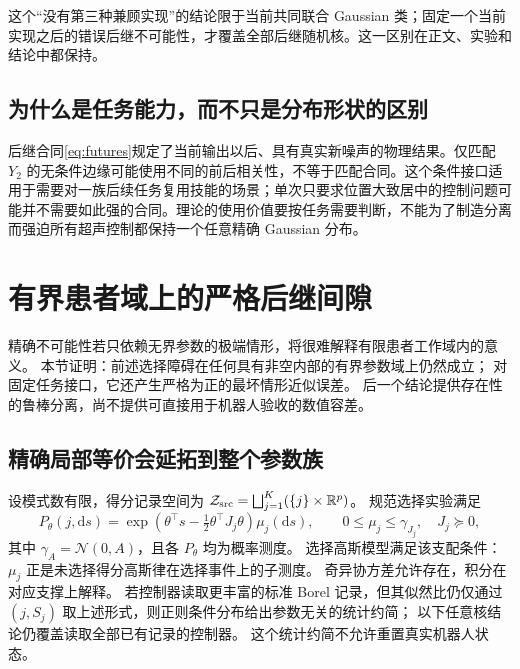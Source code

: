 \documentclass[UTF8,fontset=fandol,zihao=5,a4paper]{ctexart}
\theoremstyle{definition}
\theoremstyle{remark}\newtheorem{remark}[theorem]{说明}
\numberwithin{equation}{section}
\begin{document}
这个“没有第三种兼顾实现”的结论限于当前共同联合 Gaussian 类；固定一个当前实现之后的错误后继不可能性，才覆盖全部后继随机核。这一区别在正文、实验和结论中都保持。

\subsection{为什么是任务能力，而不只是分布形状的区别}
后继合同\eqref{eq:futures}规定了当前输出以后、具有真实新噪声的物理结果。仅匹配 $Y_2$ 的无条件边缘可能使用不同的前后相关性，不等于匹配合同。这个条件接口适用于需要对一族后续任务复用技能的场景；单次只要求位置大致居中的控制问题可能并不需要如此强的合同。理论的使用价值要按任务需要判断，不能为了制造分离而强迫所有超声控制都保持一个任意精确 Gaussian 分布。




\section{有界患者域上的严格后继间隙}
\label{sec:compact-gap}

精确不可能性若只依赖无界参数的极端情形，将很难解释有限患者工作域内的意义。
本节证明：前述选择障碍在任何具有非空内部的有界参数域上仍然成立；
对固定任务接口，它还产生严格为正的最坏情形近似误差。
后一个结论提供存在性的鲁棒分离，尚不提供可直接用于机器人验收的数值容差。

\subsection{精确局部等价会延拓到整个参数族}

设模式数有限，得分记录空间为
$\mathcal Z_{\rm src}=\bigsqcup_{j=1}^{K}(\{j\}\times\mathbb R^p)$。
规范选择实验满足
\begin{equation}
 P_\theta(j,\mathrm ds)
 =\exp\!\left(\theta^\top s-
 \tfrac12\theta^\top J_j\theta\right)\mu_j(\mathrm ds),
 \qquad 0\leq\mu_j\leq\gamma_{J_j},\quad J_j\succeq0,
 \label{eq:gap-source}
\end{equation}
其中 $\gamma_A=\mathcal N(0,A)$，且各 $P_\theta$ 均为概率测度。
选择高斯模型满足该支配条件：$\mu_j$ 正是未选择得分高斯律在选择事件上的子测度。
奇异协方差允许存在，积分在对应支撑上解释。
若控制器读取更丰富的标准 Borel 记录，但其似然比仍仅通过 $(j,S_j)$
取上述形式，则正则条件分布给出参数无关的统计约简；
以下任意核结论仍覆盖读取全部已有记录的控制器。
这个统计约简不允许重置真实机器人状态。
\end{document}

